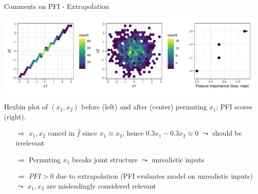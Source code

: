 \documentclass[11pt,compress,t,notes=noshow, aspectratio=169, xcolor=table]{beamer}
\begin{document}
\begin{frame}{Comments on PFI - Extrapolation}
\pause
\centerline{\includegraphics[width=\linewidth]{figure_man/pfi_hexbin_extrapolation.pdf}}

Hexbin plot of $(x_1, x_2)$ before (left) and after (center) permuting $x_1$;  
PFI scores (right).

\pause

\begin{itemize}
  \item[$\Rightarrow$] $x_1, x_2$ cancel in $\hat{f}$ since $x_1 \approx x_2$, hence $0.3 x_1 - 0.3 x_2 \approx 0$ $\leadsto$ should be irrelevant
  \item[$\Rightarrow$] Permuting $x_1$ breaks joint structure $\leadsto$ unrealistic inputs
  \item[$\Rightarrow$] $PFI > 0$ due to extrapolation (PFI evaluates model on unrealistic inputs)\\ $\leadsto$ $x_1, x_2$ are misleadingly considered relevant
\end{itemize}

\end{frame}
\end{document}
